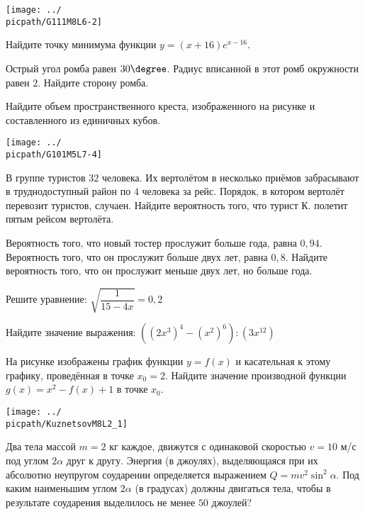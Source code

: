 \begin{class}[number=2]
\begin{listofex}
		\begin{minipage}[t]{\picwidth}
			\texttt{[image: ../\\picpath/G111M8L6-2]}
		\end{minipage}
		\item Найдите точку минимума функции \( y=(x+16)e^{x-16} \).
	\end{listofex}
	\begin{listofex}
		\item Острый угол ромба равен \( 30\degree \). Радиус вписанной в этот ромб окружности равен \( 2 \). Найдите сторону ромба.
		\item
		\begin{minipage}[t]{\bodywidth}
			Найдите объем пространственного креста, изображенного на рисунке и составленного из единичных кубов.
		\end{minipage}
		\begin{minipage}[t]{\picwidth}
			\texttt{[image: ../\\picpath/G101M5L7-4]}
		\end{minipage}
		\item В группе туристов \( 32 \) человека. Их вертолётом в несколько приёмов забрасывают в труднодоступный район по \( 4 \) человека за рейс. Порядок, в котором вертолёт перевозит туристов, случаен. Найдите вероятность того, что турист К. полетит пятым рейсом вертолёта.
		\item Вероятность того, что новый тостер прослужит больше года, равна \( 0,94 \). Вероятность того, что он прослужит больше двух лет, равна \( 0,8 \). Найдите вероятность того, что он прослужит меньше двух лет, но больше года.
		\item Решите уравнение: \( \sqrt{\dfrac{1}{15-4x}}=0,2 \)
		\item Найдите значение выражения: \( ((2x^3)^4-(x^2)^6):(3x^{12}) \)
		\item 
		\begin{minipage}[t]{\bodywidth}
			На рисунке изображены график функции \( y=f(x) \) и касательная к этому графику, проведённая в точке \( x_0=2 \). Найдите значение производной функции \( g(x)=x^2-f(x)+1 \) в точке \( x_0 \).
		\end{minipage}
		\begin{minipage}[t]{\picwidth}
			\texttt{[image: ../\\picpath/KuznetsovM8L2\_1]}
		\end{minipage}
		\item Два тела массой \(m=2\) кг каждое, движутся с одинаковой скоростью  \(v =10\) м/с под углом \(2\alpha\) друг к другу. Энергия (в джоулях), выделяющаяся при их абсолютно неупругом соударении определяется выражением \(Q= m v^2 \sin^2 \alpha \). Под каким наименьшим углом \(2\alpha\) (в градусах) должны двигаться тела, чтобы в результате соударения выделилось не менее \(50\) джоулей?

\end{listofex}
\end{class}

